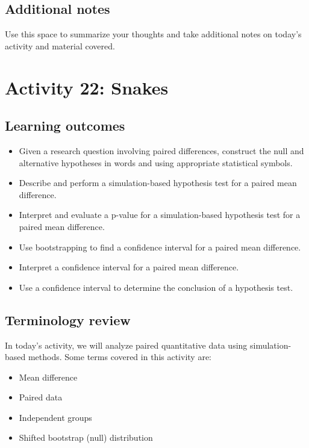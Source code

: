 \documentclass[
]{report}
\begin{document}
\subsection{Additional notes}\label{additional-notes}

Use this space to summarize your thoughts and take additional notes on today's activity and material covered.

\newpage

\section{Activity 22: Snakes}\label{activity-22-snakes}


\subsection{Learning outcomes}\label{learning-outcomes-1}

\begin{itemize}
\item
  Given a research question involving paired differences, construct the null and alternative hypotheses
  in words and using appropriate statistical symbols.
\item
  Describe and perform a simulation-based hypothesis test for a paired mean difference.
\item
  Interpret and evaluate a p-value for a simulation-based hypothesis test for a paired mean difference.
\item
  Use bootstrapping to find a confidence interval for a paired mean difference.
\item
  Interpret a confidence interval for a paired mean difference.
\item
  Use a confidence interval to determine the conclusion of a hypothesis test.
\end{itemize}

\subsection{Terminology review}\label{terminology-review-1}

In today's activity, we will analyze paired quantitative data using simulation-based methods. Some terms covered in this activity are:

\begin{itemize}
\item
  Mean difference
\item
  Paired data
\item
  Independent groups
\item
  Shifted bootstrap (null) distribution
\end{itemize}
\end{document}
